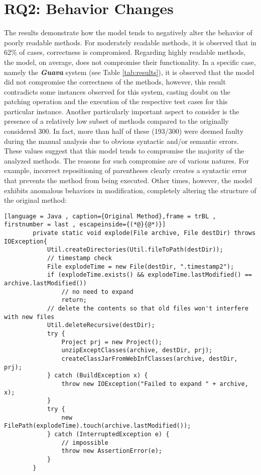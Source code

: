 \section{RQ2: Behavior Changes} %
The results demonstrate how the model tends to negatively alter the behavior of poorly readable methods. For moderately readable methods, it is observed that in 62\% of cases, correctness is compromised. Regarding highly readable methods, the model, on average, does not compromise their functionality. In a specific case, namely the \textbf{\textit{Guava}} system (see Table \ref{tab:results}), it is observed that the model did not compromise the correctness of the methods, however, this result contradicts some instances observed for this system, casting doubt on the patching operation and the execution of the respective test cases for this particular instance. Another particularly important aspect to consider is the presence of a relatively low subset of methods compared to the originally considered 300. In fact, more than half of these (193/300) were deemed faulty during the manual analysis due to obvious syntactic and/or semantic errors. These values suggest that this model tends to compromise the majority of the analyzed methods.
The reasons for such compromise are of various natures. For example, incorrect repositioning of parentheses clearly creates a syntactic error that prevents the method from being executed. Other times, however, the model exhibits anomalous behaviors in modification, completely altering the structure of the original method:
\begin{lstlisting}[language = Java , caption={Original Method},frame = trBL , firstnumber = last , escapeinside={(*@}{@*)}]
		private static void explode(File archive, File destDir) throws IOException{
		    Util.createDirectories(Util.fileToPath(destDir));
		    // timestamp check
		    File explodeTime = new File(destDir, ".timestamp2");
		    if (explodeTime.exists() && explodeTime.lastModified() == archive.lastModified())
		        // no need to expand
		        return;
		    // delete the contents so that old files won't interfere with new files
		    Util.deleteRecursive(destDir);
		    try {
		        Project prj = new Project();
		        unzipExceptClasses(archive, destDir, prj);
		        createClassJarFromWebInfClasses(archive, destDir, prj);
		    } catch (BuildException x) {
		        throw new IOException("Failed to expand " + archive, x);
		    }
		    try {
		        new FilePath(explodeTime).touch(archive.lastModified());
		    } catch (InterruptedException e) {
		        // impossible
		        throw new AssertionError(e);
		    }
		}
\end{lstlisting}
